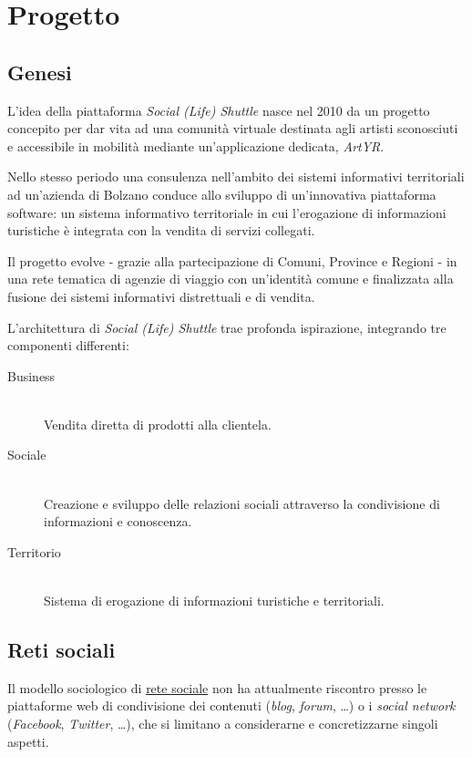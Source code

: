 \chapter{Progetto}
\label{ch:tesi:progetto}

\section{Genesi}
\label{sec:tesi:progetto:genesi}
L'idea della piattaforma \textit{Social (Life) Shuttle} nasce nel 2010 da un progetto concepito per dar vita ad una comunità virtuale destinata agli artisti sconosciuti e accessibile in mobilità mediante un'applicazione dedicata, \textit{ArtYR}.

Nello stesso periodo una consulenza nell'ambito dei sistemi informativi territoriali ad un'azienda di Bolzano conduce allo sviluppo di un'innovativa piattaforma software: un sistema informativo territoriale in cui l'erogazione di informazioni turistiche è integrata con la vendita di servizi collegati.

Il progetto evolve - grazie alla partecipazione di Comuni, Province e Regioni - in una rete tematica di agenzie di viaggio con un'identità comune e finalizzata alla fusione dei sistemi informativi distrettuali e di vendita.

L'architettura di \textit{Social (Life) Shuttle} trae profonda ispirazione, integrando tre componenti differenti:
\begin{description}
	\item[Business] \hfill \\
	Vendita diretta di prodotti alla clientela.
	\item[Sociale] \hfill \\
	Creazione e sviluppo delle relazioni sociali attraverso la condivisione di informazioni e conoscenza.
	\item[Territorio] \hfill \\
	Sistema di erogazione di informazioni turistiche e territoriali.
\end{description}

\section{Reti sociali}
\label{sec:tesi:progetto:reti-sociali}
Il modello sociologico di \underline{rete sociale} non ha attualmente riscontro presso le piattaforme web di condivisione dei contenuti (\textit{blog}, \textit{forum}, \ldots) o i \textit{social network} (\textit{Facebook}, \textit{Twitter}, \ldots), che si limitano a considerarne e concretizzarne singoli aspetti.

